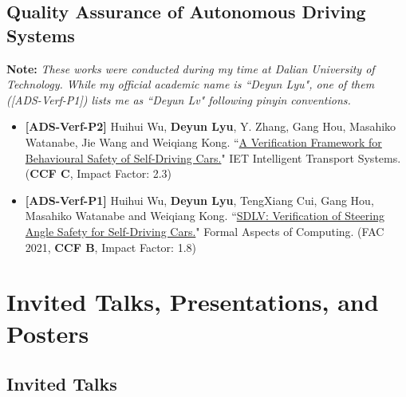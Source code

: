 \documentclass[11pt,a4paper]{moderncv}        %
\newcommand{\highlight}[1]{\textcolor{deepPurple}{\textbf{#1}}}
\begin{document}
\subsection{Quality Assurance of Autonomous Driving Systems} 
\noindent \textbf{Note:} \textit{These works were conducted during my time at Dalian University of Technology. While my official academic name is ``Deyun Lyu", one of them ([ADS-Verf-P1]) lists me as ``Deyun Lv" following pinyin conventions.}

\begin{itemize}
    \item \textbf{[ADS-Verf-P2]} Huihui Wu, \textbf{Deyun Lyu}, Y. Zhang, Gang Hou, Masahiko Watanabe, Jie Wang and Weiqiang Kong. ``\href{https://ietresearch.onlinelibrary.wiley.com/doi/full/10.1049/itr2.12162}{A Verification Framework for Behavioural Safety of Self-Driving Cars.}" IET Intelligent Transport Systems. (\highlight{CCF C}, Impact Factor: 2.3)
    \item \textbf{[ADS-Verf-P1]} Huihui Wu, \textbf{Deyun Lyu}, TengXiang Cui, Gang Hou, Masahiko Watanabe and Weiqiang Kong. ``\href{https://link.springer.com/article/10.1007/s00165-021-00539-2}{SDLV: Verification of Steering Angle Safety for Self-Driving Cars.}" Formal Aspects of Computing. (FAC 2021, \highlight{CCF B}, Impact Factor: 1.8)
\end{itemize}

\section{Invited Talks, Presentations, and Posters}

\subsection{Invited Talks}
\end{document}
